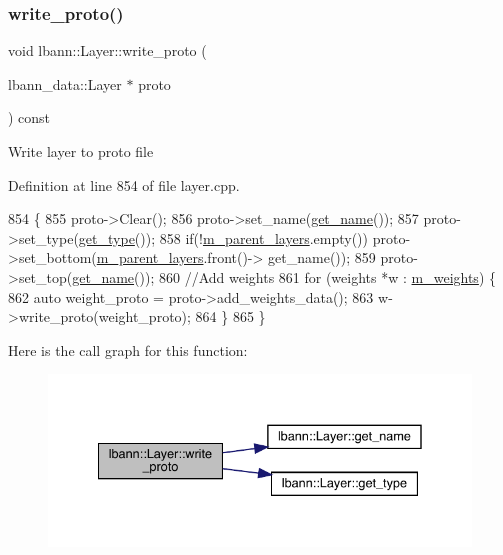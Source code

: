 \subsubsection{\texorpdfstring{write\+\_\+proto()}{write\_proto()}}
{\footnotesize\ttfamily void lbann\+::\+Layer\+::write\+\_\+proto (\begin{DoxyParamCaption}\item[{lbann\+\_\+data\+::\+Layer $\ast$}]{proto }\end{DoxyParamCaption}) const\hspace{0.3cm}{\ttfamily [virtual]}}

Write layer to proto file 

Definition at line 854 of file layer.\+cpp.


\begin{DoxyCode}
854                                                     \{
855   proto->Clear();
856   proto->set\_name(\hyperlink{classlbann_1_1Layer_a80027550202fa7dbb1dd55fa8a66c84b}{get\_name}());
857   proto->set\_type(\hyperlink{classlbann_1_1Layer_a0fa0ea9160b490c151c0a17fde4f7239}{get\_type}());
858   \textcolor{keywordflow}{if}(!\hyperlink{classlbann_1_1Layer_a3fa7c6cf1a22bb14ab0e85e3dc6027c5}{m\_parent\_layers}.empty()) proto->set\_bottom(\hyperlink{classlbann_1_1Layer_a3fa7c6cf1a22bb14ab0e85e3dc6027c5}{m\_parent\_layers}.front()->
      get\_name());
859   proto->set\_top(\hyperlink{classlbann_1_1Layer_a80027550202fa7dbb1dd55fa8a66c84b}{get\_name}());
860   \textcolor{comment}{//Add weights}
861   \textcolor{keywordflow}{for} (weights *w : \hyperlink{classlbann_1_1Layer_a7954e30fbf9100a6ba4b56d02767a469}{m\_weights}) \{
862     \textcolor{keyword}{auto} weight\_proto = proto->add\_weights\_data();
863     w->write\_proto(weight\_proto);
864   \}
865 \}
\end{DoxyCode}
Here is the call graph for this function\+:\nopagebreak
\begin{figure}[H]
\begin{center}
\leavevmode
\includegraphics[width=335pt]{classlbann_1_1Layer_ab94eb4ac28bac0c472a1da83ade4adf1_cgraph}
\end{center}
\end{figure}
